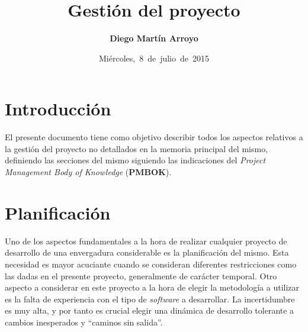 
\usepackage{xcolor}
\usepackage{pdfpages}

\newcommand{\hmwkTitle}{Gestión del proyecto} %
\newcommand{\hmwkDueDate}{Miércoles,\ 8\ de\ julio\ de\ 2015}
\newcommand{\hmwkClassInstructor}{Rodrigo Santamaría} %
\newcommand{\hmwkAuthorName}{Diego Martín Arroyo} %
\newcommand{\hmwkSubject}{6} %

\newcommand{\ordinalindicator}{\hspace{-1.5mm}$\phantom{a}^{\circ}$}
\title{\hmwkTitle}
\author{\textbf{\hmwkAuthorName}}
\date{\hmwkDueDate}

\maketitle

\tableofcontents

\section{Introducción}

El presente documento tiene como objetivo describir todos los aspectos relativos a la gestión del proyecto no detallados en la memoria principal del mismo, definiendo las secciones del mismo siguiendo las indicaciones del \textit{Project Management Body of Knowledge} (\textbf{PMBOK}).

\section{Planificación}

Uno de los aspectos fundamentales a la hora de realizar cualquier proyecto de desarrollo de una envergadura considerable es la planificación del mismo. Esta necesidad es mayor acuciante cuando se consideran diferentes restricciones como las dadas en el presente proyecto, generalmente de carácter temporal. Otro aspecto a considerar en este proyecto a la hora de elegir la metodología a utilizar es la falta de experiencia con el tipo de \textit{software} a desarrollar. La incertidumbre es muy alta, y por tanto es crucial elegir una dinámica de desarrollo tolerante a cambios inesperados y ``caminos sin salida''.

